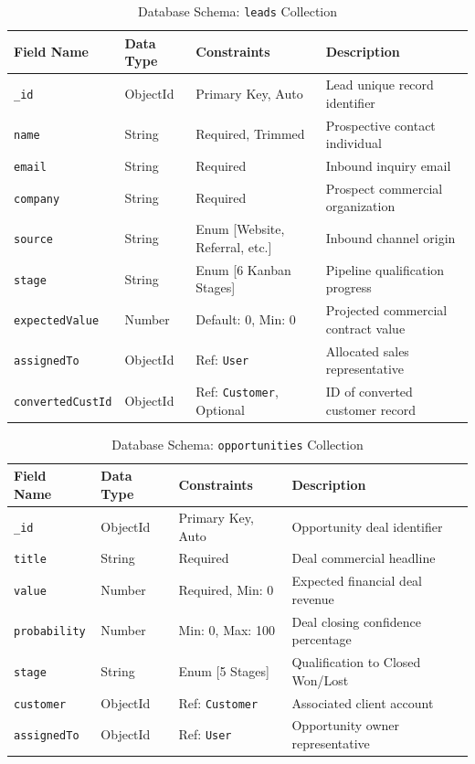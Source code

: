 \begin{table}[h!]
\centering
\caption{Database Schema: \texttt{leads} Collection}
\label{tab:schema_lead}
\renewcommand{\arraystretch}{1.2}
\begin{tabular}{|p{3cm}|p{3cm}|p{3.5cm}|p{4.5cm}|}
\hline
\textbf{Field Name} & \textbf{Data Type} & \textbf{Constraints} & \textbf{Description} \\ \hline
\texttt{\_id} & ObjectId & Primary Key, Auto & Lead unique record identifier \\ \hline
\texttt{name} & String & Required, Trimmed & Prospective contact individual \\ \hline
\texttt{email} & String & Required & Inbound inquiry email \\ \hline
\texttt{company} & String & Required & Prospect commercial organization \\ \hline
\texttt{source} & String & Enum [Website, Referral, etc.] & Inbound channel origin \\ \hline
\texttt{stage} & String & Enum [6 Kanban Stages] & Pipeline qualification progress \\ \hline
\texttt{expectedValue}& Number & Default: 0, Min: 0 & Projected commercial contract value \\ \hline
\texttt{assignedTo} & ObjectId & Ref: \texttt{User} & Allocated sales representative \\ \hline
\texttt{convertedCustId}& ObjectId & Ref: \texttt{Customer}, Optional & ID of converted customer record \\ \hline
\end{tabular}
\end{table}

\begin{table}[h!]
\centering
\caption{Database Schema: \texttt{opportunities} Collection}
\label{tab:schema_opportunity}
\renewcommand{\arraystretch}{1.2}
\begin{tabular}{|p{3cm}|p{3cm}|p{3.5cm}|p{4.5cm}|}
\hline
\textbf{Field Name} & \textbf{Data Type} & \textbf{Constraints} & \textbf{Description} \\ \hline
\texttt{\_id} & ObjectId & Primary Key, Auto & Opportunity deal identifier \\ \hline
\texttt{title} & String & Required & Deal commercial headline \\ \hline
\texttt{value} & Number & Required, Min: 0 & Expected financial deal revenue \\ \hline
\texttt{probability} & Number & Min: 0, Max: 100 & Deal closing confidence percentage \\ \hline
\texttt{stage} & String & Enum [5 Stages] & Qualification to Closed Won/Lost \\ \hline
\texttt{customer} & ObjectId & Ref: \texttt{Customer} & Associated client account \\ \hline
\texttt{assignedTo} & ObjectId & Ref: \texttt{User} & Opportunity owner representative \\ \hline
\end{tabular}
\end{table}

